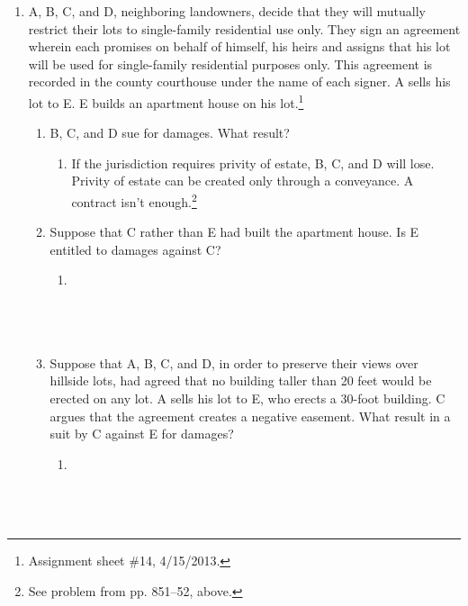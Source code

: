 \begin{enumerate}
    \item A, B, C, and D, neighboring landowners, decide that they will 
    mutually restrict their lots to single-family residential use only. They 
    sign an agreement wherein each promises on behalf of himself, his heirs 
    and assigns that his lot will be used for single-family residential 
    purposes only. This agreement is recorded in the county courthouse under 
    the name of each signer. A sells his lot to E. E builds an apartment house 
    on his lot.\footnote{Assignment sheet \#14, 4/15/2013.}
    \begin{enumerate}
        \item B, C, and D sue for damages. What result?
        \begin{enumerate}
            \item If the jurisdiction requires privity of estate, B, C, and D 
            will lose. Privity of estate can be created only through a 
            conveyance. A contract isn't enough.\footnote{See problem from pp. 
            851--52, above.}
        \end{enumerate}
        \item Suppose that C rather than E had built the apartment house. Is E 
        entitled to damages against C?
        \begin{enumerate}
            \item ~\\\\\\\\ %
        \end{enumerate}
        \item Suppose that A, B, C, and D, in order to preserve their views 
        over hillside lots, had agreed that no building taller than 20 feet 
        would be erected on any lot. A sells his lot to E, who erects a 
        30-foot building. C argues that the agreement creates a negative 
        easement. What result in a suit by C against E for damages?    
        \begin{enumerate}
            \item ~\\\\\\\\ %
        \end{enumerate}
    \end{enumerate}
\end{enumerate}


